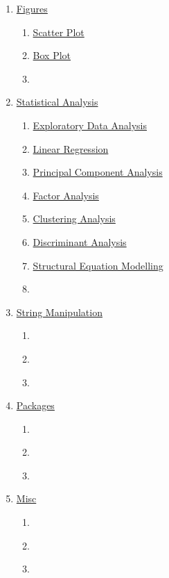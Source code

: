 \documentclass[
  12pt,
]{article}
\begin{document}
\begin{enumerate}
\begin{enumerate}
  \item \hyperref[sec:DS-]{}
  \item \hyperref[sec:DS-]{}
  \item \hyperref[sec:DS-]{}
  \end{enumerate}
\item \hyperref[sec:Fig]{Figures}
  \begin{enumerate}
  \item \hyperref[sec:Fig-]{Scatter Plot}
  \item \hyperref[sec:Fig-]{Box Plot}
  \item \hyperref[sec:Fig-]{}
  \end{enumerate}
\item \hyperref[sec:SA]{Statistical Analysis}
  \begin{enumerate}
  \item \hyperref[sec:SA-EDA]{Exploratory Data Analysis}
  \item \hyperref[sec:SA-LR]{Linear Regression}
  \item \hyperref[sec:SA-PCA]{Principal Component Analysis}
  \item \hyperref[sec:SA-FA]{Factor Analysis}
  \item \hyperref[sec:SA-CA]{Clustering Analysis}
  \item \hyperref[sec:SA-DA]{Discriminant Analysis}
  \item \hyperref[sec:SA-SEM]{Structural Equation Modelling}
  \item \hyperref[sec:SA-]{}
  \end{enumerate}
\item \hyperref[sec:SM]{String Manipulation}
  \begin{enumerate}
  \item \hyperref[sec:SM-]{}
  \item \hyperref[sec:SM-]{}
  \item \hyperref[sec:SM-]{}
  \end{enumerate}
\item \hyperref[sec:Pkg]{Packages}
  \begin{enumerate}
  \item \hyperref[sec:Pkg-]{}
  \item \hyperref[sec:Pkg-]{}
  \item \hyperref[sec:Pkg-]{}
  \end{enumerate}
\item \hyperref[sec:Misc]{Misc}
  \begin{enumerate}
  \item \hyperref[sec:Misc-]{}
  \item \hyperref[sec:Misc-]{}
  \item \hyperref[sec:Misc-]{}
  \end{enumerate}
\end{enumerate}
\end{document}
